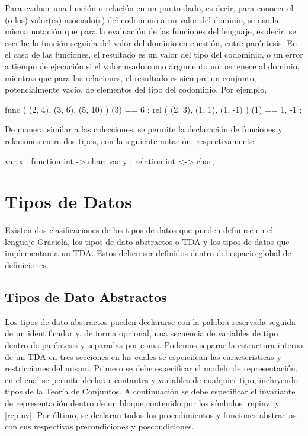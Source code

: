 Para evaluar una función o relación en un punto dado, es decir, para conocer el
(o los) valor(es) asociado(s) del codominio a un valor del dominio, se usa la
misma notación que para la evaluación de las funciones del lenguaje, es decir,
se escribe la función seguida del valor del dominio en cuestión, entre
paréntesis. En el caso de las funciones, el resultado es un valor del tipo del
codominio, o un error a tiempo de ejecución si el valor usado como argumento no
pertenece al dominio, mientras que para las relaciones, el resultado es siempre
un conjunto, potencialmente vacío, de elementos del tipo del codominio. Por
ejemplo,

\begin{gracielacode}
{ func ({ (2, 4), (3, 6), (5, 10) }) (3) == 6 };
{ rel  ({ (2, 3), (1, 1), (1, -1) }) (1) == {1, -1} };
\end{gracielacode}

De manera similar a las colecciones, se permite la declaración de funciones y
relaciones entre dos tipos, con la siguiente notación, respectivamente:

\begin{gracielacode}
var x : function int -> char;
var y : relation int <-> char;
\end{gracielacode}

\section{Tipos de Datos}
Existen dos clasificaciones de los tipos de datos que pueden definirse en el
lenguaje Graciela, los tipos de dato abstractos o TDA y los tipos de datos
que implementan a un TDA. Estos deben ser definidos dentro del espacio global
de definiciones.

\subsection{Tipos de Dato Abstractos}

Los tipos de dato abstractos pueden declararse con la palabra reservada
 seguida de un identificador y, de forma opcional, una secuencia
de variables de tipo dentro de paréntesis y separadas por coma. Podemos separar
la estructura interna de un TDA en tres secciones en las cuales se espeicifcan
las caracteristicas y restricciones del mismo. Primero se debe especificar el
modelo de representación, en el cual se permite declarar contantes y variables
de cualquier tipo, incluyendo tipos de la Teoría de Conjuntos. A continuación se
debe especificar el invariante de representación dentro de un bloque contenido
por los símbolos \ingra|{repinv| y \ingra|repinv}|. Por último, se declaran
todos los procedimientos y funciones abstractas con sus respectivas
precondiciones y poscondiciones.

